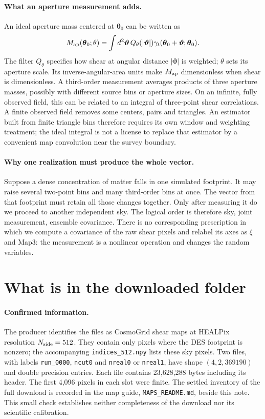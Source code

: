 \documentclass[11pt]{article}
\begin{document}
\paragraph{What an aperture measurement adds.}
An ideal aperture mass centered at $\boldsymbol\theta_0$ can be written as
\begin{equation}
 M_{\rm ap}(\boldsymbol\theta_0;\theta)
 =\int d^2\boldsymbol\vartheta\,
 Q_\theta(|\boldsymbol\vartheta|)
 \gamma_t(\boldsymbol\theta_0+\boldsymbol\vartheta;
                 \boldsymbol\theta_0).
\end{equation}
The filter $Q_\theta$ specifies how shear at angular distance
$|\boldsymbol\vartheta|$ is weighted; $\theta$ sets its aperture scale.
Its inverse-angular-area units make $M_{\rm ap}$ dimensionless when shear
is dimensionless. A third-order measurement averages products of three
aperture masses, possibly with different source bins or aperture sizes.
On an infinite, fully observed field, this can be related to an integral of
three-point shear correlations. A finite observed field removes some
centers, pairs and triangles. An estimator built from finite triangle bins
therefore requires its own window and weighting treatment; the ideal
integral is not a license to replace that estimator by a convenient map
convolution near the survey boundary.

\paragraph{Why one realization must produce the whole vector.}
Suppose a dense concentration of matter falls in one simulated footprint.
It may raise several two-point bins and many third-order bins at once.
The vector from that footprint must retain all those changes together.
Only after measuring it do we proceed to another independent sky. The
logical order is therefore sky, joint measurement, ensemble covariance.
There is no corresponding prescription in which we compute a covariance
of the raw shear pixels and relabel its axes as $\xi$ and Map3: the
measurement is a nonlinear operation and changes the random variables.

\section{What is in the downloaded folder}
\paragraph{Confirmed information.}
The producer identifies the files as CosmoGrid shear maps at HEALPix
resolution $N_{\rm side}=512$. They contain only pixels where the DES
footprint is nonzero; the accompanying \texttt{indices\_512.npy} lists these sky
pixels. Two files, with labels \texttt{run\_0000}, \texttt{ncut0} and
\texttt{nreal0} or \texttt{nreal1}, have shape $(4,2,369190)$ and double
precision entries. Each file contains 23,628,288 bytes including its header.
The first 4,096 pixels in each slot were finite. The settled inventory of the
full download is recorded in the map guide, \nolinkurl{MAPS_README.md},
beside this note. This small check establishes neither completeness of the
download nor its scientific calibration.
\end{document}
